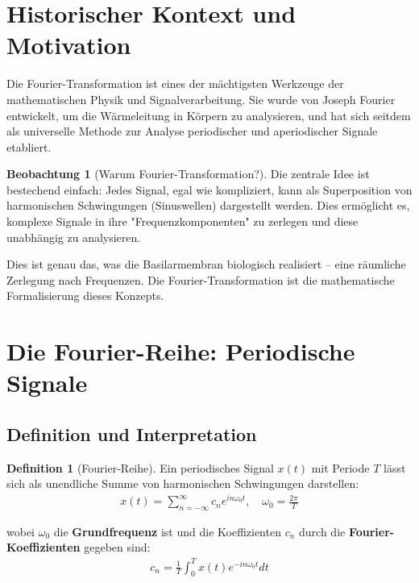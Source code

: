 ﻿\documentclass[a4paper,12pt]{report}
\theoremstyle{definition}
\newtheorem{definition}{Definition}
\newtheorem{beobachtung}{Beobachtung}
\begin{document}
	\section{Historischer Kontext und Motivation}
	
	Die Fourier-Transformation ist eines der mächtigsten Werkzeuge der mathematischen Physik und Signalverarbeitung. Sie wurde von Joseph Fourier entwickelt, um die Wärmeleitung in Körpern zu analysieren, und hat sich seitdem als universelle Methode zur Analyse periodischer und aperiodischer Signale etabliert.
	
	\begin{beobachtung}[Warum Fourier-Transformation?]
		Die zentrale Idee ist bestechend einfach: Jedes Signal, egal wie kompliziert, kann als Superposition von harmonischen Schwingungen (Sinuswellen) dargestellt werden. Dies ermöglicht es, komplexe Signale in ihre "Frequenzkomponenten" zu zerlegen und diese unabhängig zu analysieren.
		
		Dies ist genau das, was die Basilarmembran biologisch realisiert -- eine räumliche Zerlegung nach Frequenzen. Die Fourier-Transformation ist die mathematische Formalisierung dieses Konzepts.
	\end{beobachtung}
	
	\section{Die Fourier-Reihe: Periodische Signale}
	
	\subsection{Definition und Interpretation}
	
	\begin{definition}[Fourier-Reihe]
		Ein periodisches Signal $x(t)$ mit Periode $T$ lässt sich als unendliche Summe von harmonischen Schwingungen darstellen:
		\begin{align}
			x(t) = \sum_{n=-\infty}^{\infty} c_n e^{i n \omega_0 t}, \quad \omega_0 = \frac{2\pi}{T}
		\end{align}
		
		wobei $\omega_0$ die \textbf{Grundfrequenz} ist und die Koeffizienten $c_n$ durch die \textbf{Fourier-Koeffi\-zienten} gegeben sind:
		\begin{align}
			c_n = \frac{1}{T} \int_0^T x(t) e^{-i n \omega_0 t} dt
		\end{align}
	\end{definition}
	
\end{document}
